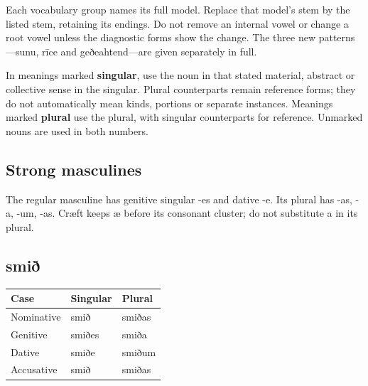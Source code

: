 Each vocabulary group names its full model. Replace that model’s stem by the listed stem, retaining its endings. Do not remove an internal vowel or change a root vowel unless the diagnostic forms show the change. The three new patterns—sunu, rīce and geðeahtend—are given separately in full.

In meanings marked \textbf{singular}, use the noun in that stated material, abstract or collective sense in the singular. Plural counterparts remain reference forms; they do not automatically mean kinds, portions or separate instances. Meanings marked \textbf{plural} use the plural, with singular counterparts for reference. Unmarked nouns are used in both numbers.

\subsection*{Strong masculines}

The regular masculine has genitive singular -es and dative -e. Its plural has -as, -a, -um, -as. Cræft keeps æ before its consonant cluster; do not substitute a in its plural.

\subsection*{smið}

\par\begingroup
\fontsize{10.5}{13.2}\selectfont
\setlength{\LTleft}{0pt}\setlength{\LTright}{\fill}
\noindent
\begin{tabular}{@{}>{\raggedright\arraybackslash}p{39.46mm}>{\raggedright\arraybackslash}p{39.46mm}>{\raggedright\arraybackslash}p{39.46mm}@{}}
\toprule
\textbf{Case} & \textbf{Singular} & \textbf{Plural} \\
\midrule
Nominative & smið & smiðas \\
Genitive & smiðes & smiða \\
Dative & smiðe & smiðum \\
Accusative & smið & smiðas \\
\bottomrule
\end{tabular}
\par\endgroup

